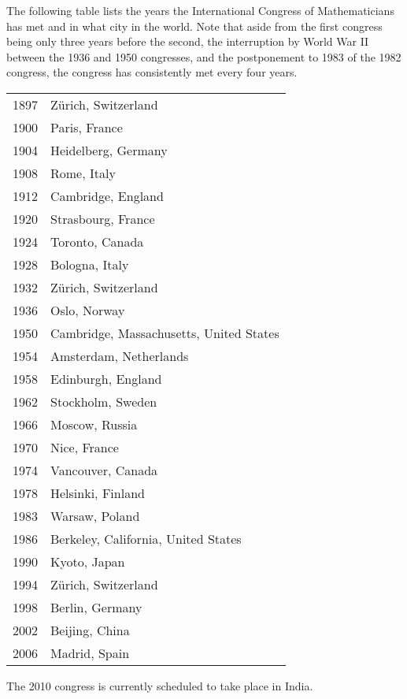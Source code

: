\documentclass[12pt]{article}
\begin{document}
The following table lists the years the International Congress of Mathematicians has met and in what city in the world. Note that aside from the first congress being only three years before the second, the interruption by World War II between the 1936 and 1950 congresses, and the postponement to 1983 of the 1982 congress, the congress has consistently met every four years.

\begin{tabular}{|r|l|}
1897 & Z\"urich, Switzerland \\
1900 & Paris, France \\
1904 & Heidelberg, Germany \\
1908 & Rome, Italy \\
1912 & Cambridge, England \\
1920 & Strasbourg, France \\
1924 & Toronto, Canada \\
1928 & Bologna, Italy \\
1932 & Z\"urich, Switzerland \\
1936 & Oslo, Norway \\
1950 & Cambridge, Massachusetts, United States \\
1954 & Amsterdam, Netherlands \\
1958 & Edinburgh, England \\
1962 & Stockholm, Sweden \\
1966 & Moscow, Russia\\
1970 & Nice, France \\
1974 & Vancouver, Canada \\
1978 & Helsinki, Finland \\
1983 & Warsaw, Poland \\
1986 & Berkeley, California, United States \\
1990 & Kyoto, Japan \\
1994 & Z\"urich, Switzerland \\
1998 & Berlin, Germany \\
2002 & Beijing, China \\
2006 & Madrid, Spain \\
\end{tabular}

The 2010 congress is currently scheduled to take place in India.

\end{document}
